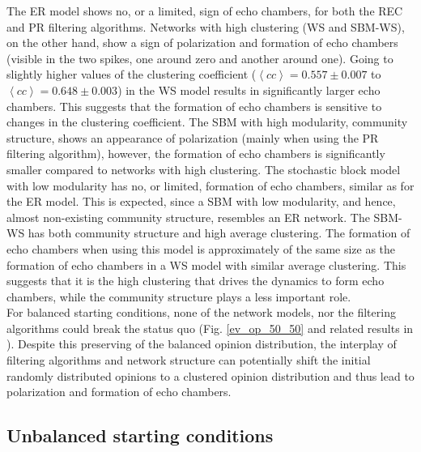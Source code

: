 \documentclass[11 pt , letterpaper , twoside , openright]{book}
\begin{document}
The ER model shows no, or a limited, sign of echo chambers, for both the REC and PR filtering algorithms. Networks with high clustering (WS and SBM-WS), on the other hand, show a sign of polarization and formation of echo chambers (visible in the two spikes, one around zero and another around one). Going to slightly higher values of the clustering coefficient ($\left<cc\right> = 0.557 \pm 0.007$ to $\left<cc\right> = 0.648 \pm 0.003$) in the WS model results in significantly larger echo chambers. This suggests that the formation of echo chambers is sensitive to changes in the clustering coefficient. The SBM with high modularity, community structure, shows an appearance of polarization (mainly when using the PR filtering algorithm), however, the formation of echo chambers is significantly smaller compared to networks with high clustering. The stochastic block model with low modularity has no, or limited, formation of echo chambers, similar as for the ER model. This is expected, since a SBM with low modularity, and hence, almost non-existing community structure, resembles an ER network. The SBM-WS has both community structure and high average clustering. The formation of echo chambers when using this model is approximately of the same size as the formation of echo chambers in a WS model with similar average clustering. This suggests that it is the high clustering that drives the dynamics to form echo chambers, while the community structure plays a less important role. \\
\newline
For balanced starting conditions, none of the network models, nor the filtering algorithms could break the status quo (Fig. \ref{ev_op_50_50} and related results in \cite{Perra2019}). Despite this preserving of the balanced opinion distribution, the interplay of filtering algorithms and network structure can potentially shift the initial randomly distributed opinions to a clustered opinion distribution and thus lead to polarization and formation of echo chambers.

\subsection{Unbalanced starting conditions}\label{20-80}
\end{document}
